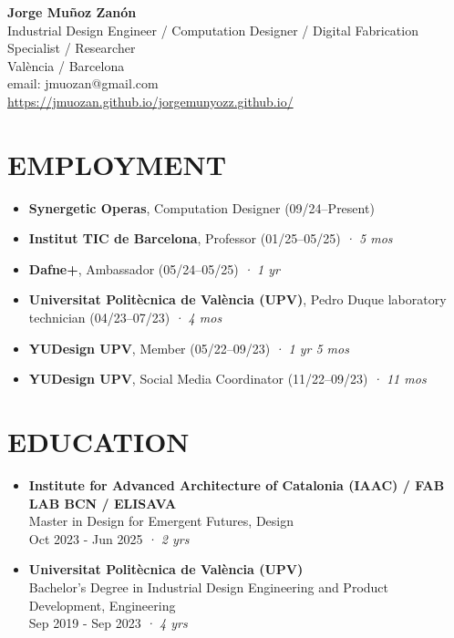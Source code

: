\documentclass[11pt,a4paper]{article}
\begin{document}
\begin{center}
\textbf{\Large Jorge Muñoz Zanón}\\
\vspace{0.1cm}
Industrial Design Engineer / Computation Designer / Digital Fabrication Specialist / Researcher\\
València / Barcelona\\
email: jmuozan@gmail.com\\
\url{https://jmuozan.github.io/jorgemunyozz.github.io/}
\end{center}

\section*{EMPLOYMENT}
\begin{itemize}[leftmargin=*,label={},itemsep=6pt]
    \item \textbf{Synergetic Operas}, Computation Designer (09/24--Present) %
    \item \textbf{Institut TIC de Barcelona}, Professor (01/25--05/25) \textit{· 5 mos} 
    \item \textbf{Dafne+}, Ambassador (05/24--05/25) \textit{· 1 yr}
    \item \textbf{Universitat Politècnica de València (UPV)}, Pedro Duque laboratory technician (04/23--07/23) \textit{· 4 mos}
    \item \textbf{YUDesign UPV}, Member (05/22--09/23) \textit{· 1 yr 5 mos}
    \item \textbf{YUDesign UPV}, Social Media Coordinator (11/22--09/23) \textit{· 11 mos}
\end{itemize}

\section*{EDUCATION}
\begin{itemize}[leftmargin=*,label={},itemsep=6pt]
    \item \textbf{Institute for Advanced Architecture of Catalonia (IAAC) / FAB LAB BCN / ELISAVA}\\
    Master in Design for Emergent Futures, Design\\
    Oct 2023 - Jun 2025 \textit{· 2 yrs}
    
    \item \textbf{Universitat Politècnica de València (UPV)}\\
    Bachelor's Degree in Industrial Design Engineering and Product Development, Engineering\\
    Sep 2019 - Sep 2023 \textit{· 4 yrs}
\end{itemize}
\end{document}
